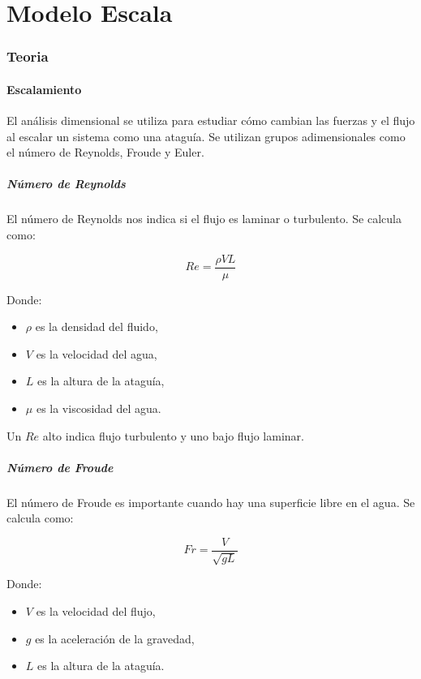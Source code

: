 \part{Modelo Escala}

\section{Teoria}

\subsection{Escalamiento}
El análisis dimensional se utiliza para estudiar cómo cambian las fuerzas y el flujo al escalar un sistema como una ataguía. Se utilizan grupos adimensionales como el número de Reynolds, Froude y Euler.

\subsubsection{Número de Reynolds}
El número de Reynolds nos indica si el flujo es laminar o turbulento. Se calcula como:

\begin{equation}
Re = \frac{\rho V L}{\mu}
\end{equation}

Donde:
\begin{itemize}
    \item $\rho$ es la densidad del fluido,
    \item $V$ es la velocidad del agua,
    \item $L$ es la altura de la ataguía,
    \item $\mu$ es la viscosidad del agua.
\end{itemize}

Un $Re$ alto indica flujo turbulento y uno bajo flujo laminar.

\subsubsection{Número de Froude}
El número de Froude es importante cuando hay una superficie libre en el agua. Se calcula como:

\begin{equation}
Fr = \frac{V}{\sqrt{g L}}
\end{equation}

Donde:
\begin{itemize}
    \item $V$ es la velocidad del flujo,
    \item $g$ es la aceleración de la gravedad,
    \item $L$ es la altura de la ataguía.
\end{itemize}

